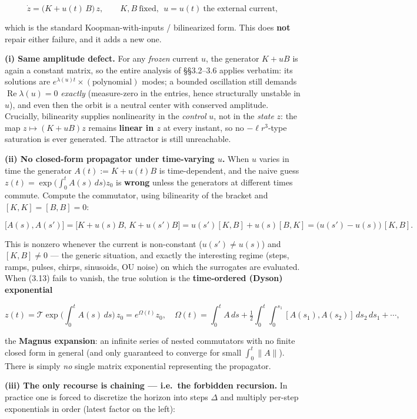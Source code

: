 \documentclass[
  11pt,
]{article}
\begin{document}
\[
\dot z = \big(K + u(t)\,B\big)\,z,
\qquad K,B\ \text{fixed},\ \ u=u(t)\ \text{the external current},
\tag{3.12}
\]

which is the standard Koopman-with-inputs / bilinearized form. This does
\textbf{not} repair either failure, and it adds a new one.

\textbf{(i) Same amplitude defect.} For any \emph{frozen} current \(u\),
the generator \(K+uB\) is again a constant matrix, so the entire
analysis of §§3.2--3.6 applies verbatim: its solutions are
\(e^{\lambda(u)t}\times(\text{polynomial})\) modes; a bounded
oscillation still demands \(\operatorname{Re}\lambda(u)=0\)
\emph{exactly} (measure-zero in the entries, hence structurally unstable
in \(u\)), and even then the orbit is a neutral center with conserved
amplitude. Crucially, bilinearity supplies nonlinearity in the
\emph{control} \(u\), not in the \emph{state} \(z\): the map
\(z\mapsto(K+uB)z\) remains \textbf{linear in \(z\)} at every instant,
so no \(-\ell r^3\)-type saturation is ever generated. The attractor is
still unreachable.

\textbf{(ii) No closed-form propagator under time-varying \(u\).} When
\(u\) varies in time the generator \(A(t):=K+u(t)B\) is time-dependent,
and the naive guess \(z(t)=\exp\!\big(\int_0^t A(s)\,ds\big)z_0\) is
\textbf{wrong} unless the generators at different times commute. Compute
the commutator, using bilinearity of the bracket and \([K,K]=[B,B]=0\):

\[
\big[A(s),A(s')\big]
=\big[K+u(s)B,\,K+u(s')B\big]
=u(s')[K,B]+u(s)[B,K]
=\big(u(s')-u(s)\big)\,[K,B].
\tag{3.13}
\]

This is nonzero whenever the current is non-constant (\(u(s')\ne u(s)\))
and \([K,B]\ne 0\) --- the generic situation, and exactly the
interesting regime (steps, ramps, pulses, chirps, sinusoids, OU noise)
on which the surrogates are evaluated. When (3.13) fails to vanish, the
true solution is the \textbf{time-ordered (Dyson) exponential}

\[
z(t)=\mathcal{T}\exp\!\Big(\int_0^t A(s)\,ds\Big)\,z_0
= e^{\Omega(t)}z_0,\quad
\Omega(t)=\int_0^t\!A\,ds+\tfrac12\!\int_0^t\!\!\int_0^{s_1}\![A(s_1),A(s_2)]\,ds_2\,ds_1+\cdots,
\]

the \textbf{Magnus expansion}: an infinite series of nested commutators
with no finite closed form in general (and only guaranteed to converge
for small \(\int_0^t\|A\|\)). There is simply \emph{no} single matrix
exponential representing the propagator.

\textbf{(iii) The only recourse is chaining --- i.e.~the forbidden
recursion.} In practice one is forced to discretize the horizon into
steps \(\Delta\) and multiply per-step exponentials in order (latest
factor on the left):
\end{document}

